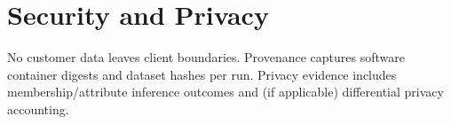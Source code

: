 
\section{Security and Privacy}
No customer data leaves client boundaries. Provenance captures software container digests and dataset hashes per run. Privacy evidence includes membership/attribute inference outcomes and (if applicable) differential privacy accounting.
